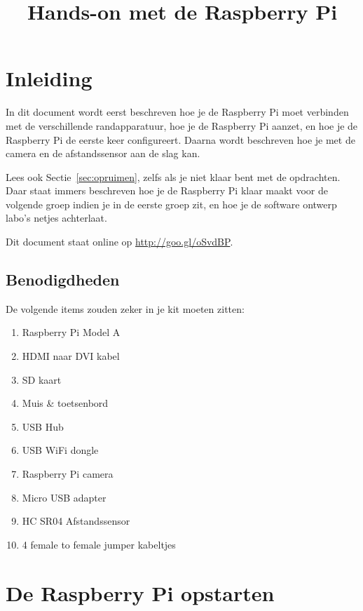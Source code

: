 \documentclass[a4paper]{article}
\title{Hands-on met de Raspberry Pi}
\begin{document}
  \maketitle
  \tableofcontents

  \section{Inleiding}

  In dit document wordt eerst beschreven hoe je de Raspberry Pi moet
verbinden met de verschillende randapparatuur, hoe je de Raspberry
Pi aanzet, en hoe je de Raspberry Pi de eerste keer configureert.
Daarna wordt beschreven hoe je met de camera en de afstandssensor aan
de slag kan.

  Lees ook Sectie~\ref{sec:opruimen}, zelfs als je niet klaar bent met
de opdrachten.  Daar staat immers beschreven hoe je de Raspberry Pi
klaar maakt voor de volgende groep indien je in de eerste groep zit,
en hoe je de software ontwerp labo's netjes achterlaat.

  Dit document staat online op \url{http://goo.gl/oSvdBP}.

    \subsection{Benodigdheden}

    De volgende items zouden zeker in je kit moeten zitten:

    \begin{enumerate}
      \item Raspberry Pi Model A
      \item HDMI naar DVI kabel
      \item SD kaart
      \item Muis \& toetsenbord
      \item USB Hub
      \item USB WiFi dongle
      \item Raspberry Pi camera
      \item Micro USB adapter
      \item HC SR04 Afstandssensor
      \item 4 female to female jumper kabeltjes
    \end{enumerate}

  \section{De Raspberry Pi opstarten}
\end{document}
